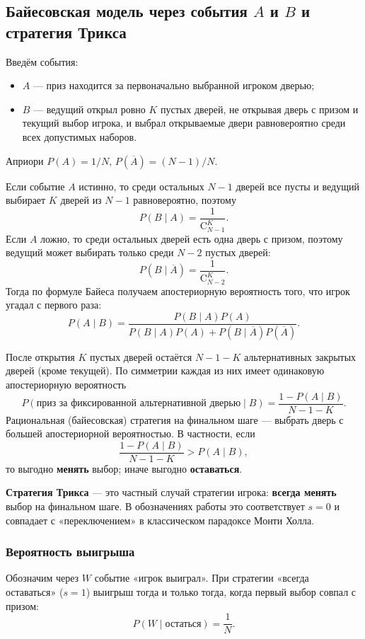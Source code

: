 \documentclass[a4paper, 14pt]{extarticle}
\begin{document}
\subsection{Байесовская модель через события $A$ и $B$ и стратегия Трикса}
Введём события:
\begin{itemize}[nosep]
  \item $A$ --- приз находится за первоначально выбранной игроком дверью;
  \item $B$ --- ведущий открыл ровно $K$ пустых дверей, не открывая дверь с призом и текущий выбор игрока, и выбрал открываемые двери равновероятно среди всех допустимых наборов.
\end{itemize}
Априори $P(A)=1/N$, $P(\overline{A})=(N-1)/N$.

Если событие $A$ истинно, то среди остальных $N-1$ дверей все пусты и ведущий выбирает $K$ дверей из $N-1$ равновероятно, поэтому
\[
P(B\mid A)=\frac{1}{\mathrm{C}_{N-1}^{K}}.
\]
Если $A$ ложно, то среди остальных дверей есть одна дверь с призом, поэтому ведущий может выбирать только среди $N-2$ пустых дверей:
\[
P(B\mid \overline{A})=\frac{1}{\mathrm{C}_{N-2}^{K}}.
\]
Тогда по формуле Байеса получаем апостериорную вероятность того, что игрок угадал с первого раза:
\begin{equation}\label{eq:bayes_posterior}
P(A\mid B)=\frac{P(B\mid A)P(A)}{P(B\mid A)P(A)+P(B\mid \overline{A})P(\overline{A})}.
\end{equation}

После открытия $K$ пустых дверей остаётся $N-1-K$ альтернативных закрытых дверей (кроме текущей). По симметрии каждая из них имеет одинаковую апостериорную вероятность
\[
P(\text{приз за фиксированной альтернативной дверью}\mid B)=\frac{1-P(A\mid B)}{N-1-K}.
\]
Рациональная (байесовская) стратегия на финальном шаге --- выбрать дверь с большей апостериорной вероятностью. В частности, если
\[
\frac{1-P(A\mid B)}{N-1-K} > P(A\mid B),
\]
то выгодно \textbf{менять} выбор; иначе выгодно \textbf{оставаться}.

\textbf{Стратегия Трикса} --- это частный случай стратегии игрока: \textbf{всегда менять} выбор на финальном шаге. В обозначениях работы это соответствует $s=0$ и совпадает с «переключением» в классическом парадоксе Монти Холла.

\subsubsection{Вероятность выигрыша}
Обозначим через $W$ событие «игрок выиграл». При стратегии «всегда оставаться» ($s=1$) выигрыш тогда и только тогда, когда первый выбор совпал с призом:
\begin{equation}\label{eq:stay}
  P(W \mid \text{остаться}) = \frac{1}{N}.
\end{equation}
\end{document}

